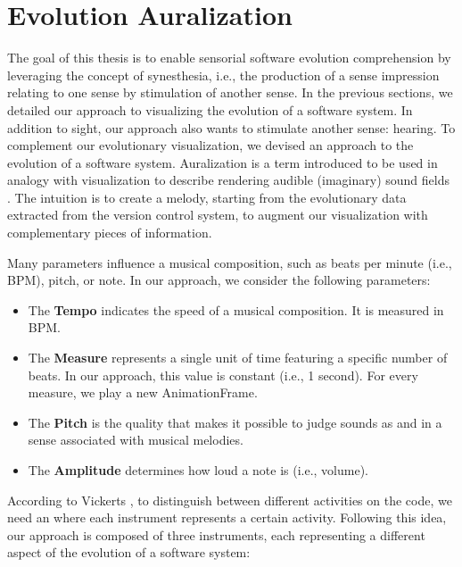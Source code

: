 \newpage
\section{Evolution Auralization}
\label{sec:audioApproach}
The goal of this thesis is to enable sensorial software evolution comprehension by leveraging the concept of synesthesia, i.e., the production of a sense impression relating to one sense by stimulation of another sense. In the previous sections, we detailed our approach to visualizing the evolution of a software system. In addition to sight, our approach also wants to stimulate another sense: hearing. To complement our evolutionary visualization, we devised an approach to \emph{} the evolution of a software system. Auralization is a term introduced to be used in analogy with visualization to describe rendering audible (imaginary) sound fields \cite{kleiner1993}. The intuition is to create a melody, starting from the evolutionary data extracted from the version control system, to augment our visualization with complementary pieces of information.


Many parameters influence a musical composition, such as beats per minute (i.e., BPM), pitch, or note. In our approach, we consider the following parameters:

\begin{itemize}
    \item The \textbf{Tempo} indicates the speed of a musical composition. It is measured in BPM. 
    \item The \textbf{Measure} represents a single unit of time featuring a specific number of beats. In our approach, this value is constant (i.e., 1 second). For every measure, we play a new AnimationFrame.
	\item The \textbf{Pitch} is the quality that makes it possible to judge sounds as  and  in a sense associated with musical melodies.
	\item The \textbf{Amplitude} determines how loud a note is (i.e., volume).
\end{itemize}

According to Vickerts \cite{Vickers2004}, to distinguish between different activities on the code, we need an \emph{} where each instrument represents a certain activity. Following this idea, our approach is composed of three instruments, each representing a different aspect of the evolution of a software system:

